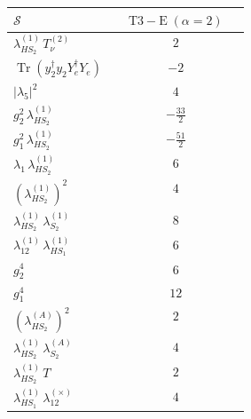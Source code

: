\documentclass[9pt]{article}
\begin{document}
\begin{longtable}{@{}p{0.31\linewidth}c@{}}
\toprule
$\mathcal{S}$ & $ \mathrm{T3-E}\;(\alpha=2) $ \\
\midrule
$ \lambda_{HS_2}^{(1)}\,T_{\nu}^{(2)} $ & $ 2 $ \\
$ \operatorname{Tr}(y_2^\dagger y_2Y_e^\dagger Y_e) $ & $ -2 $ \\
$ |\lambda_5|^2 $ & $ 4 $ \\
$ g_2^2\,\lambda_{HS_2}^{(1)} $ & $ - \frac{33}{2} $ \\
$ g_1^2\,\lambda_{HS_2}^{(1)} $ & $ - \frac{51}{2} $ \\
$ \lambda_1\,\lambda_{HS_2}^{(1)} $ & $ 6 $ \\
$ \left(\lambda_{HS_2}^{(1)}\right)^2 $ & $ 4 $ \\
$ \lambda_{HS_2}^{(1)}\,\lambda_{S_2}^{(1)} $ & $ 8 $ \\
$ \lambda_{12}^{(1)}\,\lambda_{HS_1}^{(1)} $ & $ 6 $ \\
$ g_2^4 $ & $ 6 $ \\
$ g_1^4 $ & $ 12 $ \\
$ \left(\lambda_{HS_2}^{(A)}\right)^2 $ & $ 2 $ \\
$ \lambda_{HS_2}^{(1)}\,\lambda_{S_2}^{(A)} $ & $ 4 $ \\
$ \lambda_{HS_2}^{(1)}\,T $ & $ 2 $ \\
$ \lambda_{HS_1}^{(1)}\,\lambda_{12}^{(\times)} $ & $ 4 $ \\
\bottomrule
\end{longtable}
\end{document}

